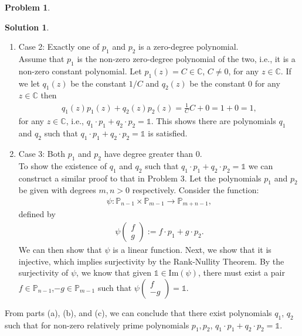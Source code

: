 \documentclass{article}
\theoremstyle{definition}
\newtheorem*{prob*}{Problem}
\newtheorem*{sln*}{Solution}
\newcommand{\ima}{\text{Im}}
\begin{document}
\begin{prob*}
\begin{sln*}
\begin{enumerate}
\begin{enumerate}
		\item Case 2: Exactly one of $p_1$ and $p_2$ is a zero-degree polynomial.\\
		
		Assume that $p_1$ is the non-zero zero-degree polynomial of the two, i.e., it is a non-zero constant polynomial. Let $p_1(z) = C \in \mathbb{C}$, $C\neq 0$, for any $z\in \mathbb{C}$. If we let $q_1(z)$ be the constant $1/C$ and $q_2(z)$ be the constant $0$ for any $z\in \mathbb{C}$ then
		\begin{align*}
		q_1(z) p_1(z) + q_2(z)p_2(z) = \frac{1}{C}C + 0 = 1 + 0 = 1,
		\end{align*}
		for any $z\in \mathbb{C}$, i.e., $q_1\cdot p_1 + q_2 \cdot p_2 = \mathbb{1}$. This shows there are polynomials $q_1$ and $q_2$ such that $q_1 \cdot p_1 + q_2 \cdot p_2 = \mathbb{1}$ is satisfied.\\
		
		\item Case 3: Both $p_1$ and $p_2$ have degree greater than 0. \\
		
		To show the existence of $q_1$ and $q_2$ such that $q_1 \cdot p_1 + q_2 \cdot p_2 = \mathbb{1}$ we can construct a similar proof to that in Problem 3. Let the polynomials $p_1$ and $p_2$ be given with degrees $m,n >0$ respectively. Consider the function:
		\begin{align}
		\psi : \mathbb{P}_{n-1} \times \mathbb{P}_{m-1} \to \mathbb{P}_{m+n-1},
		\end{align}
		defined by
		\begin{align}
		\psi\begin{pmatrix}
		f \\ g
		\end{pmatrix} := f \cdot p_1 + g\cdot p_2.
		\end{align}
		We can then show that $\psi$ is a linear function. Next, we show that it is injective, which implies surjectivity by the Rank-Nullity Theorem. By the surjectivity of $\psi$, we know that given $\mathbb{1} \in \ima(\psi)$, there must exist a pair $f\in \mathbb{P}_{n-1}$,$ -g \in \mathbb{P}_{m-1}$ such that $\psi\begin{pmatrix}
		f\\-g
		\end{pmatrix} = \mathbb{1}$. \\
		
	\end{enumerate}
	From parts (a), (b), and (c), we can conclude that there exist polynomials $q_1$, $q_2$ such that for non-zero relatively prime polynomials $p_1, p_2$, $q_1\cdot p_1 + q_2 \cdot p_2 = \mathbb{1}$.\\
	

\end{enumerate}
\end{sln*}
\end{prob*}
\end{document}
